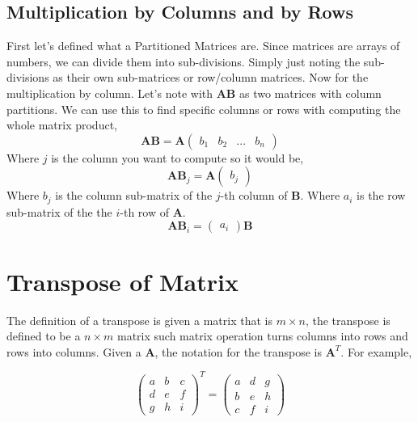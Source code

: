 \subsection{Multiplication by Columns and by Rows}
First let's defined what a Partitioned Matrices are. Since matrices are arrays of numbers, we can divide them into sub-divisions. 
Simply just noting the sub-divisions as their own sub-matrices or row/column matrices. Now for the multiplication by column. Let's note with \textbf{AB} as two matrices with column partitions. We can use this to find specific columns or rows with computing the whole matrix product, 
\begin{equation*}
	\mathbf{AB}  = \textbf{A}\begin{pmatrix}
		b_1 & b_2 & ... & b_n 
	\end{pmatrix}
\end{equation*}
Where $j$ is the column you want to compute so it would be, 
\begin{equation*}
	\mathbf{AB}_j = \textbf{A}\begin{pmatrix}
		b_j 
	\end{pmatrix}
\end{equation*} 
Where $b_j$ is the column sub-matrix of the $j$-th column of \textbf{B}. Where $a_i$ is the row sub-matrix of the the $i$-th row of \textbf{A}.
\begin{equation*}
	\mathbf{AB}_i = \begin{pmatrix}
		a_i 
	\end{pmatrix}\textbf{B}
\end{equation*}

\section{Transpose of Matrix}
The definition of a transpose is given a matrix that is $m \times n$, the transpose is defined to be a $n \times m$ matrix such matrix operation turns columns into rows and rows into columns. Given a \textbf{A}, the notation for the transpose is $\mathbf{A}^T$. For example, 

\begin{equation*}
	\begin{pmatrix}
		a & b & c \\ 
		d & e & f \\ 
		g & h & i 
	\end{pmatrix}^T = \begin{pmatrix}
		a & d & g \\ 
		b & e & h \\ 
		c & f & i 
	\end{pmatrix}
\end{equation*}

